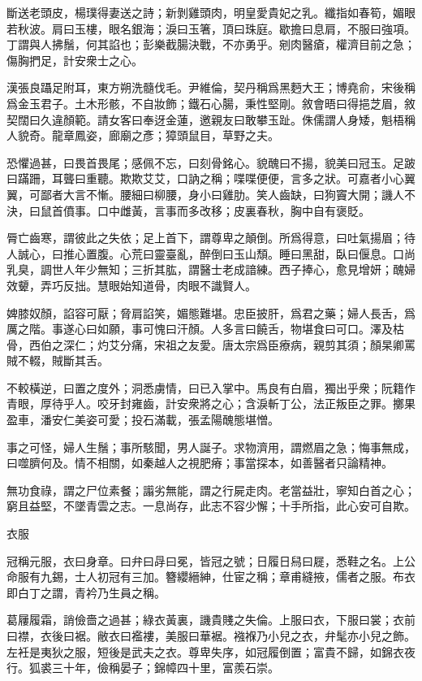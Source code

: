 \documentclass[12pt,a4paper]{ctexbook}
\begin{document}
斷送老頭皮，楊璞得妻送之詩；新剝雞頭肉，明皇愛貴妃之乳。纖指如春筍，媚眼若秋波。肩曰玉樓，眼名銀海；淚曰玉箸，頂曰珠庭。歇擔曰息肩，不服曰強項。丁謂與人拂鬚，何其諂也；彭樂截腸決戰，不亦勇乎。剜肉醫瘡，權濟目前之急；傷胸捫足，計安衆士之心。\par
漢張良躡足附耳，東方朔洗髓伐毛。尹維倫，契丹稱爲黑麪大王；博堯俞，宋後稱爲金玉君子。土木形骸，不自妝飾；鐵石心腸，秉性堅剛。敘會晤曰得挹芝眉，敘契闊曰久違顏範。請女客曰奉迓金蓮，邀親友曰敢攀玉趾。侏儒謂人身矮，魁梧稱人貌奇。龍章鳳姿，廊廟之彥；獐頭鼠目，草野之夫。\par
恐懼過甚，曰畏首畏尾；感佩不忘，曰刻骨銘心。貌醜曰不揚，貌美曰冠玉。足跛曰蹣跚，耳聾曰重聽。欺欺艾艾，口訥之稱；喋喋便便，言多之狀。可嘉者小心翼翼，可鄙者大言不慚。腰細曰柳腰，身小曰雞肋。笑人齒缺，曰狗竇大開；譏人不決，曰鼠首僨事。口中雌黃，言事而多改移；皮裏春秋，胸中自有褒貶。\par
脣亡齒寒，謂彼此之失依；足上首下，謂尊卑之顛倒。所爲得意，曰吐氣揚眉；待人誠心，曰推心置腹。心荒曰靈臺亂，醉倒曰玉山頹。睡曰黑甜，臥曰偃息。口尚乳臭，調世人年少無知；三折其肱，謂醫士老成諳練。西子捧心，愈見增妍；醜婦效顰，弄巧反拙。慧眼始知道骨，肉眼不識賢人。\par
婢膝奴顏，諂容可厭；脅肩諂笑，媚態難堪。忠臣披肝，爲君之藥；婦人長舌，爲厲之階。事遂心曰如願，事可愧曰汗顏。人多言曰饒舌，物堪食曰可口。澤及枯骨，西伯之深仁；灼艾分痛，宋祖之友愛。唐太宗爲臣療病，親剪其須；顏杲卿罵賊不輟，賊斷其舌。\par
不較橫逆，曰置之度外；洞悉虜情，曰已入掌中。馬良有白眉，獨出乎衆；阮籍作青眼，厚待乎人。咬牙封雍齒，計安衆將之心；含淚斬丁公，法正叛臣之罪。擲果盈車，潘安仁美姿可愛；投石滿載，張孟陽醜態堪憎。\par
事之可怪，婦人生鬚；事所駭聞，男人誕子。求物濟用，謂燃眉之急；悔事無成，曰噬臍何及。情不相關，如秦越人之視肥瘠；事當探本，如善醫者只論精神。\par
無功食祿，謂之尸位素餐；譾劣無能，謂之行屍走肉。老當益壯，寧知白首之心；窮且益堅，不墜青雲之志。一息尚存，此志不容少懈；十手所指，此心安可自欺。\par
衣服\par
冠稱元服，衣曰身章。曰弁曰冔曰冕，皆冠之號；日履日舄曰屣，悉鞋之名。上公命服有九錫，士人初冠有三加。簪纓縉紳，仕宦之稱；章甫縫掖，儒者之服。布衣即白丁之謂，青衿乃生員之稱。\par
葛屨履霜，誚儉嗇之過甚；綠衣黃裏，譏貴賤之失倫。上服曰衣，下服曰裳；衣前曰襟，衣後曰裾。敝衣曰襤褸，美服曰華裾。襁褓乃小兒之衣，弁髦亦小兒之飾。左衽是夷狄之服，短後是武夫之衣。尊卑失序，如冠履倒置；富貴不歸，如錦衣夜行。狐裘三十年，儉稱晏子；錦幛四十里，富羨石崇。\par
\end{document}
